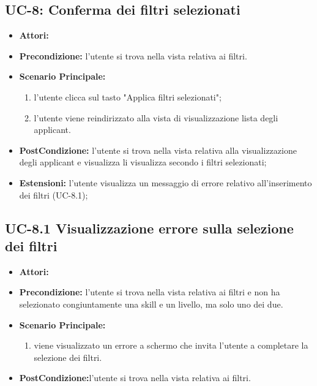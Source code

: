 \subsection{UC-8: Conferma dei filtri selezionati}
\begin{itemize}
\item \textbf{Attori:}\loggedusr
\item \textbf{Precondizione:} l'utente si trova nella vista relativa ai filtri.
\item \textbf{Scenario Principale:}
\begin{enumerate}
	\item l'utente clicca sul tasto "Applica filtri selezionati";
	\item l'utente viene reindirizzato alla vista di visualizzazione lista degli applicant.
\end{enumerate}
\item \textbf{PostCondizione:} l'utente si trova nella vista relativa alla visualizzazione degli applicant e visualizza li visualizza secondo i filtri selezionati;
\item \textbf{Estensioni:} l'utente visualizza un messaggio di errore relativo all'inserimento dei filtri (UC-8.1);
\end{itemize}

\subsection{UC-8.1 Visualizzazione errore sulla selezione dei filtri}
\begin{itemize}
\item \textbf{Attori:}\loggedusr
\item \textbf{Precondizione:} l'utente si trova nella vista relativa ai filtri e non ha selezionato congiuntamente una skill e un livello, ma solo uno dei due.
\item \textbf{Scenario Principale:}
\begin{enumerate}
	\item viene visualizzato un errore a schermo che invita l'utente a completare la selezione dei filtri.
\end{enumerate}
\item \textbf{PostCondizione:}l'utente si trova nella vista relativa ai filtri.
\end{itemize}


